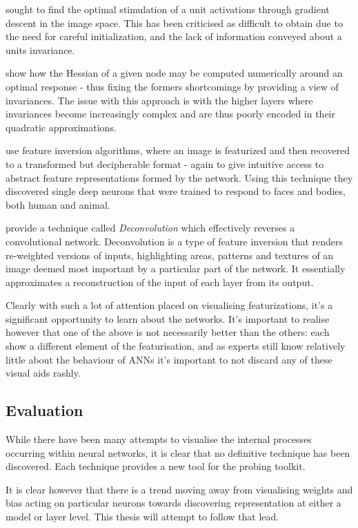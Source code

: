 \documentclass[a4paper,11pt,titlepage]{article}
\begin{document}
 		
		\par 
		\textbf{\cite{Erhan2009}} sought to find the optimal stimulation of a unit activations through gradient descent in the image space. This has been criticised as difficult to obtain due to the need for careful initialization, and the lack of information conveyed about a units invariance. 
		\par 
		\textbf{\cite{Le2010}} show how the Hessian of a given node may be computed numerically around an optimal response - thus fixing the formers shortcomings by providing a view of invariances. The issue with this approach is with the higher layers where invariances become increasingly complex and are thus poorly encoded in their quadratic approximations. 
		\par 
		\textbf{\cite{Vondrick2013a}} use feature inversion algorithms, where an image is featurized and then recovered to a transformed but decipherable format - again to give intuitive access to abstract feature representations formed by the network. Using this technique they discovered single deep neurons that were trained to respond to faces and bodies, both human and animal. 
		\par 
		\textbf{\cite{Zeiler2013}} provide a technique called \textit{Deconvolution} \cite{Zeiler2011} which effectively reverses a convolutional network. Deconvolution is a type of feature inversion that renders re-weighted versions of inputs, highlighting areas, patterns and textures of an image deemed most important by a particular part of the network. It essentially approximates a reconstruction of the input of each layer from its output.
		\par 
		Clearly with such a lot of attention placed on visualising featurizations, it's a significant opportunity to learn about the networks. It's important to realise however that one of the above is not necessarily better than the others: each show a different element of the featurisation, and as experts still know relatively little about the behaviour of ANNs it's important to not discard any of these visual aids rashly.
		
\subsection{Evaluation}
While there have been many attempts to visualise the internal processes occurring within neural networks, it is clear that no definitive technique has been discovered. Each technique provides a new tool for the probing toolkit. 
\par 
It is clear however that there is a trend moving away from visualising weights and bias acting on particular neurons towards discovering representation at either a model or layer level. This thesis will attempt to follow that lead.
\end{document}
